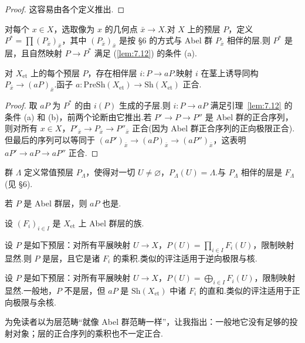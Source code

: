 \begin{proof}
这容易由各个定义推出.
\end{proof}

对每个 $x \in X$，选取像为 $x$ 的几何点 $\bar{x} \to X$.对 $X$ 上的预层 $P$，定义 $P^{*} = \prod (P_{\bar{x}})_{\bar{x}}$，其中 $(P_{\bar{x}})_{\bar{x}}$ 是按 \S 6 的方式与 Abel 群 $P_{\bar{x}}$ 相伴的层.则 $P^{*}$ 是层，且自然映射 $P \to P^{*}$ 满足 (\ref{lem:7.12}) 的条件 (a).

\begin{theorem}\label{thm:7.15}
对 $X_{\mathrm{et}}$ 上的每个预层 $P$，存在相伴层 $i \colon P \to aP$.映射 $i$ 在茎上诱导同构 $P_{\bar{x}} \to (aP)_{\bar{x}}$.函子 $a \colon \mathrm{PreSh}(X_{\mathrm{et}}) \to \mathrm{Sh}(X_{\mathrm{et}})$ 正合.
\end{theorem}

\begin{proof}
取 $aP$ 为 $P^{*}$ 的由 $i(P)$ 生成的子层.则 $i \colon P \to aP$ 满足引理~\ref{lem:7.12} 的条件 (a) 和 (b)，前两个论断由它推出.若 $P' \to P \to P''$ 是 Abel 群的正合序列，则对所有 $x \in X$，$P'_{\bar{x}} \to P_{\bar{x}} \to P''_{\bar{x}}$ 正合(因为 Abel 群正合序列的正向极限正合).但最后的序列可以等同于 $(aP')_{\bar{x}} \to (aP)_{\bar{x}} \to (aP'')_{\bar{x}}$，这表明 $aP' \to aP \to aP''$ 正合.
\end{proof}

\begin{example}\label{ex:7.16}
群 $\Lambda$ 定义常值预层 $P_{\Lambda}$，使得对一切 $U \neq \varnothing$，$P_{\Lambda}(U) = \Lambda$.与 $P_{\Lambda}$ 相伴的层是 $F_{\Lambda}$(见 \S 6).

若 $P$ 是 Abel 群层，则 $aP$ 也是.
\end{example}

\begin{remark}\label{rem:7.17}
设 $(F_i)_{i \in I}$ 是 $X_{\mathrm{et}}$ 上 Abel 群层的族.

设 $P$ 是如下预层：对所有平展映射 $U \to X$，$P(U) = \prod_{i \in I} F_i(U)$，限制映射显然.则 $P$ 是层，且它是诸 $F_i$ 的乘积.类似的评注适用于逆向极限与核.

设 $P$ 是如下预层：对所有平展映射 $U \to X$，$P(U) = \bigoplus_{i \in I} F_i(U)$，限制映射显然.一般地，$P$ 不是层，但 $aP$ 是 $\mathrm{Sh}(X_{\mathrm{et}})$ 中诸 $F_i$ 的直和.类似的评注适用于正向极限与余核.

为免读者以为层范畴``就像 Abel 群范畴一样''，让我指出：一般地它没有足够的投射对象；层的正合序列的乘积也不一定正合.
\end{remark}

